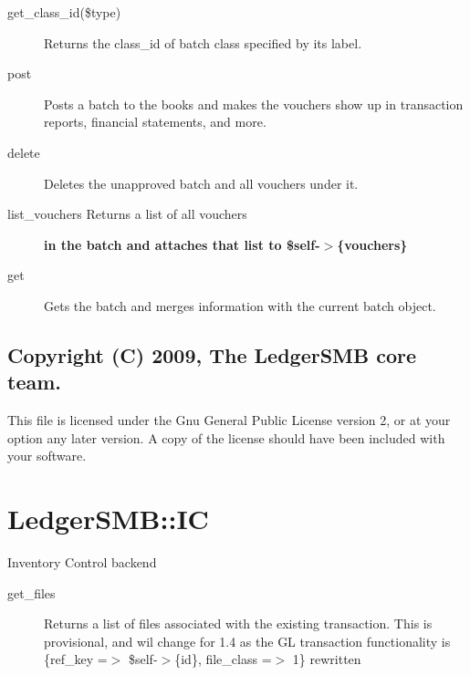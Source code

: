 \begin{description}
\begin{description}
\begin{description}
\begin{description}
\begin{description}
\begin{description}
\begin{description}
\begin{description}
\item[{get\_class\_id(\$type)}] \mbox{}

Returns the class\_id of batch class specified by its label.


\item[{post}] \mbox{}

Posts a batch to the books and makes the vouchers show up in transaction 
reports, financial statements, and more.


\item[{delete}] \mbox{}

Deletes the unapproved batch and all vouchers under it.


\item[{list\_vouchers Returns a list of all vouchers}] \textbf{in the batch and attaches that list to \$self-$>$\{vouchers\}}
\item[{get}] \mbox{}

Gets the batch and merges information with the current batch object.

\end{description}
\subsection*{Copyright (C) 2009, The LedgerSMB core team.\label{LedgerSMB::Batch_Copyright_C_2009_The_LedgerSMB_core_team_}}


This file is licensed under the Gnu General Public License version 2, or at your
option any later version.  A copy of the license should have been included with
your software.

\section{LedgerSMB::IC\label{LedgerSMB::IC}}


Inventory Control backend

\begin{description}

\item[{get\_files}] \mbox{}

Returns a list of files associated with the existing transaction.  This is 
provisional, and wil change for 1.4 as the GL transaction functionality is 
                  \{ref\_key =$>$ \$self-$>$\{id\}, file\_class =$>$ 1\}
rewritten

\end{description}

\end{description}
\end{description}
\end{description}
\end{description}
\end{description}
\end{description}
\end{description}
